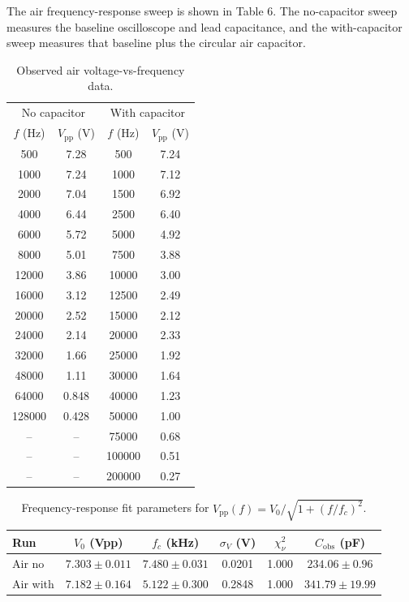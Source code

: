 \documentclass[letterpaper,12pt]{article}
\begin{document}
The air frequency-response sweep is shown in Table 6. The no-capacitor sweep measures the baseline oscilloscope and lead capacitance, and the with-capacitor sweep measures that baseline plus the circular air capacitor.

\begin{table}[H]
    \centering
    \caption{Observed air voltage-vs-frequency data.}
    \begin{tabular}{cccc}
        \toprule
        \multicolumn{2}{c}{No capacitor} & \multicolumn{2}{c}{With capacitor} \\
        $f$ (Hz) & $V_{\mathrm{pp}}$ (V) & $f$ (Hz) & $V_{\mathrm{pp}}$ (V) \\
        \midrule
        500 & 7.28 & 500 & 7.24 \\
        1000 & 7.24 & 1000 & 7.12 \\
        2000 & 7.04 & 1500 & 6.92 \\
        4000 & 6.44 & 2500 & 6.40 \\
        6000 & 5.72 & 5000 & 4.92 \\
        8000 & 5.01 & 7500 & 3.88 \\
        12000 & 3.86 & 10000 & 3.00 \\
        16000 & 3.12 & 12500 & 2.49 \\
        20000 & 2.52 & 15000 & 2.12 \\
        24000 & 2.14 & 20000 & 2.33 \\
        32000 & 1.66 & 25000 & 1.92 \\
        48000 & 1.11 & 30000 & 1.64 \\
        64000 & 0.848 & 40000 & 1.23 \\
        128000 & 0.428 & 50000 & 1.00 \\
        -- & -- & 75000 & 0.68 \\
        -- & -- & 100000 & 0.51 \\
        -- & -- & 200000 & 0.27 \\
        \bottomrule
    \end{tabular}
\end{table}

\begin{table}[H]
    \centering
    \caption{Frequency-response fit parameters for $V_{\mathrm{pp}}(f)=V_0/\sqrt{1+(f/f_c)^2}$.}
    \begin{tabular}{lccccc}
        \toprule
        Run & $V_0$ (Vpp) & $f_c$ (kHz) & $\sigma_V$ (V) & $\chi^2_\nu$ & $C_{\mathrm{obs}}$ (pF) \\
        \midrule
        Air no & $7.303\pm0.011$ & $7.480\pm0.031$ & 0.0201 & 1.000 & $234.06\pm0.96$ \\
        Air with & $7.182\pm0.164$ & $5.122\pm0.300$ & 0.2848 & 1.000 & $341.79\pm19.99$ \\
        \bottomrule
    \end{tabular}
\end{table}
\end{document}
